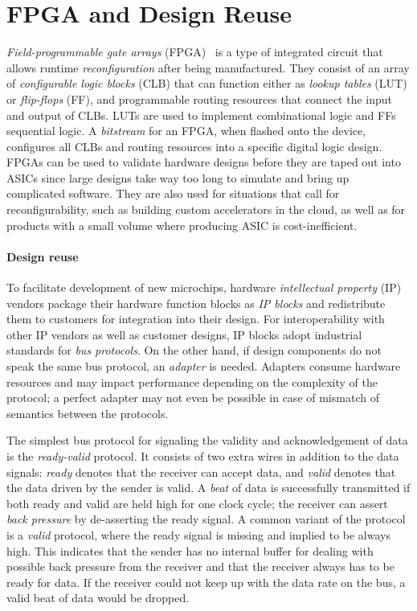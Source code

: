 \section{FPGA and Design Reuse} \label{sec:fpga-basics}

\emph{Field-programmable gate arrays} (FPGA)~\cite{brown_field-programmable_1992} is a type of integrated circuit that allows runtime \emph{reconfiguration} after being manufactured.  They consist of an array of \emph{configurable logic blocks} (CLB) that can function either as \emph{lookup tables} (LUT) or \emph{flip-flops} (FF), and programmable routing resources that connect the input and output of CLBs.  LUTs are used to implement combinational logic and FFs sequential logic.  A \emph{bitstream} for an FPGA, when flashed onto the device, configures all CLBs and routing resources into a specific digital logic design.  FPGAs can be used to validate hardware designs before they are taped out into ASICs since large designs take way too long to simulate and bring up complicated software.  They are also used for situations that call for reconfigurability, such as building custom accelerators in the cloud, as well as for products with a small volume where producing ASIC is cost-inefficient.

\paragraph{Design reuse} To facilitate development of new microchips, hardware \emph{intellectual property} (IP) vendors package their hardware function blocks as \emph{IP blocks} and redistribute them to customers for integration into their design.  For interoperability with other IP vendors as well as customer designs, IP blocks adopt industrial standards for \emph{bus protocols}.  On the other hand, if design components do not speak the same bus protocol, an \emph{adapter} is needed.  Adapters consume hardware resources and may impact performance depending on the complexity of the protocol; a perfect adapter may not even be possible in case of mismatch of semantics between the protocols.

The simplest bus protocol for signaling the validity and acknowledgement of data is the \emph{ready-valid} protocol.  It consists of two extra wires in addition to the data signals: \emph{ready} denotes that the receiver can accept data, and \emph{valid} denotes that the data driven by the sender is valid.  A \emph{beat} of data is successfully transmitted if both ready and valid are held high for one clock cycle; the receiver can assert \emph{back pressure} by de-asserting the ready signal.  A common variant of the protocol is a \emph{valid} protocol, where the ready signal is missing and implied to be always high.  This indicates that the sender has no internal buffer for dealing with possible back pressure from the receiver and that the receiver always has to be ready for data.  If the receiver could not keep up with the data rate on the bus, a valid beat of data would be dropped.

